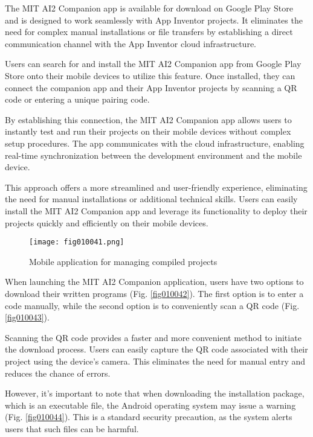 The MIT AI2 Companion app is available for download on Google Play Store and is designed to work seamlessly with App Inventor projects. It eliminates the need for complex manual installations or file transfers by establishing a direct communication channel with the App Inventor cloud infrastructure.

Users can search for and install the MIT AI2 Companion app from Google Play Store onto their mobile devices to utilize this feature. Once installed, they can connect the companion app and their App Inventor projects by scanning a QR code or entering a unique pairing code.

By establishing this connection, the MIT AI2 Companion app allows users to instantly test and run their projects on their mobile devices without complex setup procedures. The app communicates with the cloud infrastructure, enabling real-time synchronization between the development environment and the mobile device.

This approach offers a more streamlined and user-friendly experience, eliminating the need for manual installations or additional technical skills. Users can easily install the MIT AI2 Companion app and leverage its functionality to deploy their projects quickly and efficiently on their mobile devices.

\begin{figure}[H]
   \centering
   \texttt{[image: fig010041.png]}
   \caption{Mobile application for managing compiled projects}
\label{fig010041}
\end{figure}

When launching the MIT AI2 Companion application, users have two options to download their written programs (Fig. \ref{fig010042}). The first option is to enter a code manually, while the second option is to conveniently scan a QR code (Fig. \ref{fig010043}).

Scanning the QR code provides a faster and more convenient method to initiate the download process. Users can easily capture the QR code associated with their project using the device's camera. This eliminates the need for manual entry and reduces the chance of errors.

However, it's important to note that when downloading the installation package, which is an executable file, the Android operating system may issue a warning (Fig. \ref{fig010044}). This is a standard security precaution, as the system alerts users that such files can be harmful.

